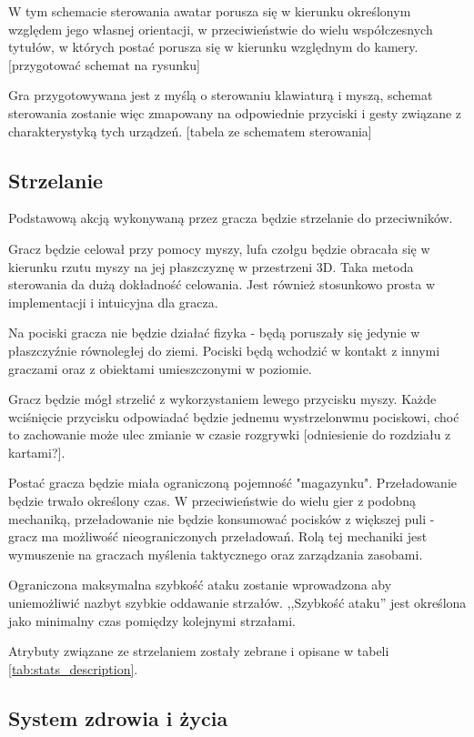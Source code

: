 W tym schemacie sterowania awatar porusza się w kierunku określonym względem jego własnej orientacji, w przeciwieństwie do wielu współczesnych tytułów, w których postać porusza się w kierunku względnym do kamery. [przygotować schemat na rysunku]

Gra przygotowywana jest z myślą o sterowaniu klawiaturą i myszą, schemat sterowania zostanie więc zmapowany na odpowiednie przyciski i gesty związane z charakterystyką tych urządzeń. [tabela ze schematem sterowania]


\subsection{Strzelanie}\label{sec:shooting_concept}

Podstawową akcją wykonywaną przez gracza będzie strzelanie do przeciwników.

Gracz będzie celował przy pomocy myszy, lufa czołgu będzie obracała się w kierunku rzutu myszy na jej płaszczyznę w przestrzeni 3D.
Taka metoda sterowania da dużą dokładność celowania. Jest również stosunkowo prosta w implementacji i intuicyjna dla gracza.

Na pociski gracza nie będzie działać fizyka - będą poruszały się jedynie w płaszczyźnie równoległej do ziemi. Pociski będą wchodzić w kontakt z innymi graczami oraz z obiektami umieszczonymi w poziomie.

Gracz będzie mógł strzelić z wykorzystaniem lewego przycisku myszy. Każde wciśnięcie przycisku odpowiadać będzie jednemu wystrzelonwmu pociskowi, choć to zachowanie może ulec zmianie w czasie rozgrywki [odniesienie do rozdziału z kartami?].

Postać gracza będzie miała ograniczoną pojemność "magazynku". Przeładowanie będzie trwało określony czas. W przeciwieństwie do wielu gier z podobną mechaniką, przeładowanie nie będzie konsumować pocisków z większej puli - gracz ma możliwość nieograniczonych przeładowań. Rolą tej mechaniki jest wymuszenie na graczach myślenia taktycznego oraz zarządzania zasobami.


Ograniczona maksymalna szybkość ataku zostanie wprowadzona aby uniemożliwić nazbyt szybkie oddawanie strzałów. ,,Szybkość ataku'' jest określona jako minimalny czas pomiędzy kolejnymi strzałami.

Atrybuty związane ze strzelaniem zostały zebrane i opisane w tabeli \ref{tab:stats_description}. 

\subsection{System zdrowia i życia}

